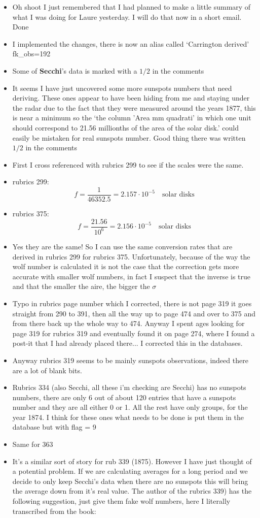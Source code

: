 \documentclass[12pt]{article}
\begin{document}
\begin{itemize}
    \item Oh shoot I just remembered that I had planned to make a little summary of what I was doing for Laure yesterday. I will do that now in a short email. Done
    \item I implemented the changes, there is now an alias called `Carrington derived' fk\_obs=192
    \item Some of \textbf{Secchi}'s data is marked with a $1/2$ in the comments
    \item It seems I have just uncovered some more sunspots numbers that need deriving. These ones appear to have been hiding from me and staying under the radar due to the fact that they were measured around the years 1877, this is near a minimum so the `the column 'Area mm quadrati' in which one unit should correspond to 21.56 millionths of the area of the solar disk.' could easily be mistaken for real sunspots number. Good thing there was written $1/2$ in the comments
    \item First I cross referenced with rubrics 299 to see if the scales were the same.
    \item rubrics 299: $$f = \frac{1}{46352.5} = 2.157\cdot 10^{-5}\quad \text{solar disks}$$
    \item rubrics 375: $$f = \frac{21.56}{10^6} = 2.156 \cdot 10^{-5}\quad\text{solar disks}$$
    \item Yes they are the same! So I can use the same conversion rates that are derived in rubrics 299 for rubrics 375. Unfortunately, because of the way the wolf number is calculated it is not the case that the correction gets more accurate with smaller wolf numbers, in fact I suspect that the inverse is true and that the smaller the aire, the bigger the $\sigma$
    \item Typo in rubrics page number which I corrected, there is not page 319 it goes straight from 290 to 391, then all the way up to page 474 and over to 375 and from there back up the whole way to 474. Anyway I spent ages looking for page 319 for rubrics 319 and eventually found it on page 274, where I found a post-it that I had already placed there... I corrected this in the databases.
    \item Anyway rubrics 319 seems to be mainly sunspots observations, indeed there are a lot of blank bits.
    \item Rubrics 334 (also Secchi, all these i'm checking are Secchi) has no sunspots numbers, there are only 6 out of about 120 entries that have a sunspots number and they are all either 0 or 1. All the rest have only groups, for the year 1874. I think for these ones what needs to be done is put them in the database but with flag = 9
    \item Same for 363
    \item It's a similar sort of story for rub 339 (1875). However I have just thought of a potential problem. If we are calculating averages for a long period and we decide to only keep Secchi's data when there are no sunspots this will bring the average down from it's real value. The author of the rubrics 339) has the following suggestion, just give them fake wolf numbers, here I literally transcribed from the book:


\end{itemize}
\end{document}
